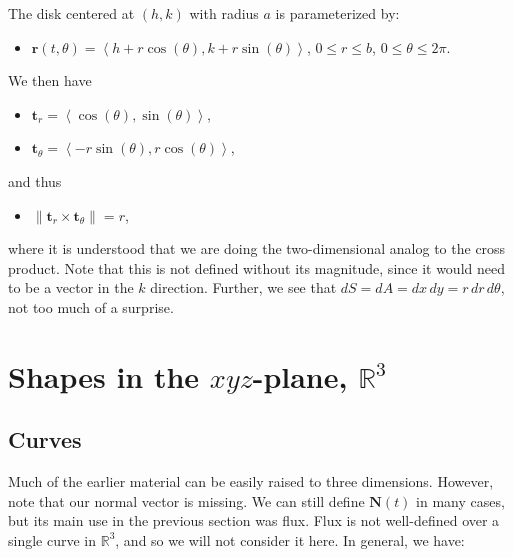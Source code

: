 \documentclass[10pt]{article}
\newcommand{\mb}[1]{\mathbf{#1}}
\newcommand{\brackett}[1]{\left\langle #1 \right\rangle}
\newcommand{\vecfuc}[2]{\mb{#1}(#2)}
\newcommand{\dvecfuc}[2]{\mb{#1}'(#2)}
\newcommand{\normdvecfuc}[2]{\| \mb{#1}'(#2) \|}
\newcommand{\mysqrt}[1]{%
  \mathpalette\foo{#1}%
}
\newcommand{\R}{\mathbb{R}}
\newcommand{\foo}[2]{%
  \sbox0{$#1\sqrt{#2}$}%
  \begin{tikzpicture}[baseline=(sqrt.base)]
    \node[inner sep=0, outer sep=0] (sqrt) {$#1\sqrt{#2}$}; %
    \draw([yshift=-0.045em]sqrt.north east) -- ++(0,-0.5ex); %
  \end{tikzpicture}%
}
\begin{document}
The disk centered at \((h,k)\) with radius \(a\) is parameterized by:
\begin{itemize}
    \item \(\vecfuc{r}{t,\theta} = \brackett{h + r \cos(\theta), k + r \sin(\theta)}\), \(0 \leq r \leq b\), \(0 \leq \theta \leq 2\pi\).
\end{itemize}
We then have
\begin{itemize}
    \item \(\mb{t}_{r} = \brackett{\cos(\theta), \sin(\theta)}\),
    \item \(\mb{t}_{\theta} = \brackett{-r \sin(\theta), r \cos(\theta)}\),
\end{itemize}
and thus
\begin{itemize}
    \item \(\| \mb{t}_{r} \times \mb{t}_{\theta} \| = r\), 
\end{itemize}
where it is understood that we are doing the two-dimensional analog to the cross product. Note that this is not defined without its magnitude, since it would need to be a vector in the \(k\) direction. Further, we see that \(dS = dA = dx \, dy = r \, dr \, d\theta\), not too much of a surprise.

\section*{Shapes in the \(xyz\)-plane, \(\R^{3}\)}

\subsection*{Curves}

Much of the earlier material can be easily raised to three dimensions. However, note that our normal vector is missing. We can still define \(\vecfuc{N}{t}\) in many cases, but its main use in the previous section was flux. Flux is not well-defined over a single curve in \(\R^{3}\), and so we will not consider it here. In general, we have:
\end{document}
